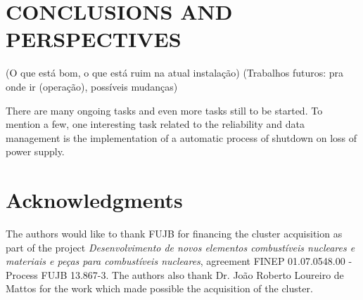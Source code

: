\documentclass[twoside,a4paper,12pt,english]{inac17}
\begin{document}









\section{CONCLUSIONS AND PERSPECTIVES}

(O que está bom, o que está ruim na atual instalação)
(Trabalhos futuros: pra onde ir (operação), possíveis mudanças)

There are many ongoing tasks and even more tasks still to be started. To mention a few, one
interesting task related to the reliability and data management is the implementation of
a automatic process of shutdown on loss of power supply.






\section*{Acknowledgments}
The authors would like to thank FUJB for financing the cluster acquisition
as part of the project \textit{Desenvolvimento de novos elementos combust\'{i}veis nucleares
  e materiais e pe\c{c}as para combust\'{i}veis nucleares}, agreement FINEP 01.07.0548.00 - Process FUJB 13.867-3.
The authors also thank Dr. Jo\~{a}o Roberto Loureiro de Mattos for the work which made possible the acquisition
of the cluster.

\end{document}
